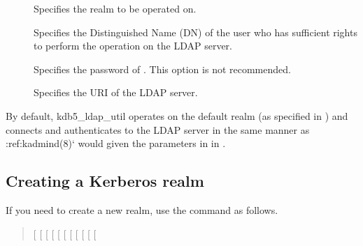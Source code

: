 \documentclass[letterpaper,10pt,english]{sphinxmanual}
\begin{document}
\begin{description}
\item[{ }] \leavevmode
Specifies the realm to be operated on.

\item[{ }] \leavevmode
Specifies the Distinguished Name (DN) of the user who has
sufficient rights to perform the operation on the LDAP server.

\item[{ }] \leavevmode
Specifies the password of .  This option is not
recommended.

\item[{ }] \leavevmode
Specifies the URI of the LDAP server.

\end{description}

By default, kdb5\_ldap\_util operates on the default realm (as specified
in {\hyperref[\detokenize{admin/conf_files/krb5_conf:krb5-conf-5}]{}}) and connects and authenticates to the LDAP
server in the same manner as :ref:kadmind(8){}` would given the
parameters in {\hyperref[\detokenize{admin/conf_files/kdc_conf:dbdefaults}]{}} in {\hyperref[\detokenize{admin/conf_files/kdc_conf:kdc-conf-5}]{}}.


\subsection{Creating a Kerberos realm}
\label{\detokenize{admin/database:creating-a-kerberos-realm}}\label{\detokenize{admin/database:ldap-create-realm}}
If you need to create a new realm, use the {\hyperref[\detokenize{admin/admin_commands/kdb5_ldap_util:kdb5-ldap-util-8}]{}}
 command as follows.
\begin{quote}

{[} \sphinxstyleemphasis{subtree\_dn\_list}{]}
{[} \sphinxstyleemphasis{search\_scope}{]}
{[} \sphinxstyleemphasis{container\_reference\_dn}{]}
{[} \sphinxstyleemphasis{mkeytype}{]}
{[} \sphinxstyleemphasis{mkeyVNO}{]}
{[} \sphinxstyleemphasis{mkeyname}{]}
{[} \textbar{} \sphinxstyleemphasis{stashfilename}{]}
{[}\sphinxstylestrong{-s}{]}
{[} \sphinxstyleemphasis{max\_ticket\_life}{]}
{[} \sphinxstyleemphasis{max\_renewable\_ticket\_life}{]}
{[}\sphinxstyleemphasis{ticket\_flags}{]}
\end{quote}
\end{document}
